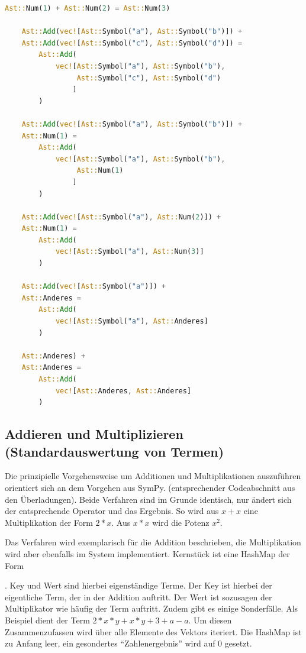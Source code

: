\documentclass[11pt,a4paper, ngerman]{article}
\begin{document}
\begin{lstlisting}[language=rust, caption={smarte Operatenüberladung}]
    Ast::Num(1) + Ast::Num(2) = Ast::Num(3)

    Ast::Add(vec![Ast::Symbol("a"), Ast::Symbol("b")]) +
    Ast::Add(vec![Ast::Symbol("c"), Ast::Symbol("d")]) = 
        Ast::Add(
            vec![Ast::Symbol("a"), Ast::Symbol("b"), 
                 Ast::Symbol("c"), Ast::Symbol("d")
                ]
        )

    Ast::Add(vec![Ast::Symbol("a"), Ast::Symbol("b")]) +
    Ast::Num(1) =
        Ast::Add(
            vec![Ast::Symbol("a"), Ast::Symbol("b"), 
                 Ast::Num(1)
                ]
        )

    Ast::Add(vec![Ast::Symbol("a"), Ast::Num(2)]) +
    Ast::Num(1) =
        Ast::Add(
            vec![Ast::Symbol("a"), Ast::Num(3)]
        )

    Ast::Add(vec![Ast::Symbol("a")]) +
    Ast::Anderes =
        Ast::Add(
            vec![Ast::Symbol("a"), Ast::Anderes]
        )

    Ast::Anderes) +
    Ast::Anderes =
        Ast::Add(
            vec![Ast::Anderes, Ast::Anderes]
        )
\end{lstlisting}

\subsection{Addieren und Multiplizieren (Standardauswertung von Termen)}
Die prinzipielle Vorgehensweise um Additionen und Multiplikationen auszuführen orientiert sich an dem Vorgehen aus SymPy. (entsprechender Codeabschnitt aus den Überladungen). Beide Verfahren sind im Grunde identisch, nur ändert sich der entsprechende Operator und das Ergebnis. So wird aus $x+x$ eine Multiplikation der Form $2*x$. Aus $x*x$ wird die Potenz $x^2$. 

Das Verfahren wird exemplarisch für die Addition beschrieben, die Multiplikation wird aber ebenfalls im System implementiert. Kernstück ist eine HashMap der Form

. Key und Wert sind hierbei eigenständige Terme. Der Key ist hierbei der eigentliche Term, der in der Addition auftritt. Der Wert ist sozusagen der Multiplikator wie häufig der Term auftritt. Zudem gibt es einige Sonderfälle. Als Beispiel dient der Term 
$2*x*y + x*y + 3 + a - a$. Um diesen Zusammenzufassen wird über alle Elemente des Vektors iteriert. Die HashMap ist zu Anfang leer, ein gesondertes ``Zahlenergebnis'' wird auf 0 gesetzt.
\end{document}
